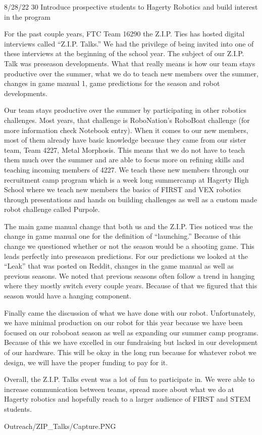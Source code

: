 {8/28/22}
{30}
{Introduce prospective students to Hagerty Robotics and build interest in the program} 
{
For the past couple years, FTC Team 16290 the Z.I.P. Ties has hosted digital interviews called “Z.I.P. Talks.” We had the privilege of being invited into one of these interviews at the beginning of the school year. The subject of our Z.I.P. Talk was preseason developments. What that really means is how our team stays productive over the summer, what we do to teach new members over the summer, changes in game manual 1, game predictions for the season and robot developments. 

Our team stays productive over the summer by participating in other robotics challenges. Most years, that challenge is RoboNation’s RoboBoat challenge (for more information check Notebook entry). 
When it comes to our new members, most of them already have basic knowledge because they came from our sister team, Team 4227, Metal Morphosis. This means that we do not have to teach them much over the summer and are able to focus more on refining skills and teaching incoming members of 4227. We teach these new members through our recruitment camp program which is a week long summercamp at Hagerty High School where we teach new members the basics of FIRST and VEX robotics through presentations and hands on building challenges as well as a custom made robot challenge called Purpole. 

The main game manual change that both us and the Z.I.P. Ties noticed was the change in game manual one for the definition of “launching.” Because of this change we questioned whether or not the season would be a shooting game. This leads perfectly into preseason predictions. For our predictions we looked at the “Leak” that was posted on Reddit, changes in the game manual as well as previous seasons. We noted that previous seasons often follow a trend in hanging where they mostly switch every couple years. Because of that we figured that this season would have a hanging component.

Finally came the discussion of what we have done with our robot. Unfortunately, we have minimal production on our robot for this year because we have been focused on our roboboat season as well as expanding our summer camp programs. Because of this we have excelled in our fundraising but lacked in our development of our hardware. This will be okay in the long run because for whatever robot we design, we will have the proper funding to pay for it.

Overall, the Z.I.P. Talks event was a lot of fun to participate in. We were able to increase communication between teams, spread more about what we do at Hagerty robotics and hopefully reach to a larger audience of FIRST and STEM students.


} 

{Outreach/ZIP_Talks/Capture.PNG}